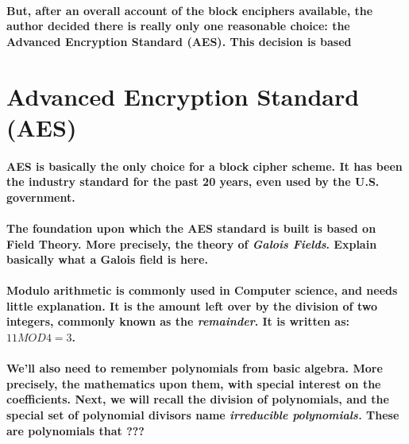 \paragraph{But, after an overall account of the block enciphers available, the author decided there is really only one reasonable choice: the Advanced Encryption Standard (AES). This decision is based }

\section{Advanced Encryption Standard (AES)}

\paragraph{AES is basically the only choice for a block cipher scheme. It has been the industry standard for the past 20 years, even used by the U.S. government.}\cite{book4}



\paragraph{The foundation upon which the AES standard is built is based on Field Theory. More precisely, the theory of \emph{Galois Fields}. Explain basically what a Galois field is here.}

\paragraph{Modulo arithmetic is commonly used in Computer science, and needs little explanation. It is the amount left over by the division of two integers, commonly known as the \emph{remainder}. It is written as: $11 MOD 4 = 3$.}

\paragraph{We'll also need to remember polynomials from basic algebra. More precisely, the mathematics upon them, with special interest on the coefficients. Next, we will recall the division of polynomials, and the special set of polynomial divisors name \emph{irreducible polynomials.} These are polynomials that ???}

